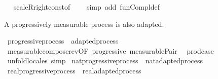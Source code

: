 \begin{isabellebody}
\isadelimproof
\ %
\endisadelimproof
%
\isatagproof
{}\isamarkupfalse%
\ scaleR{\isacharunderscore}{\kern0pt}right{\isacharunderscore}{\kern0pt}const{\isacharbrackleft}{\kern0pt}of\ {\isachardoublequoteopen}{\isasymlambda}{\isacharunderscore}{\kern0pt}{\isachardot}{\kern0pt}\ {\isacharminus}{\kern0pt}{}{\isachardoublequoteclose}{\isacharbrackright}{\kern0pt}\ \isamarkupfalse%
\ {\isacharparenleft}{\kern0pt}simp\ add{\isacharcolon}{\kern0pt}\ fun{\isacharunderscore}{\kern0pt}Compl{\isacharunderscore}{\kern0pt}def{\isacharparenright}{\kern0pt}%
\endisatagproof
{\isafoldproof}%
%
\isadelimproof
%
\endisadelimproof
\isanewline
\isanewline
{}\isamarkupfalse%
%
\begin{isamarkuptext}%
A progressively measurable process is also adapted.%
\end{isamarkuptext}\isamarkuptrue%
\isamarkupfalse%
\ progressive{\isacharunderscore}{\kern0pt}process\ {\isasymsubseteq}\ adapted{\isacharunderscore}{\kern0pt}process%
\isadelimproof
\ %
\endisadelimproof
%
\isatagproof
{}\isamarkupfalse%
\ measurable{\isacharunderscore}{\kern0pt}compose{\isacharunderscore}{\kern0pt}rev{\isacharbrackleft}{\kern0pt}OF\ progressive\ measurable{\isacharunderscore}{\kern0pt}Pair{}{\isacharprime}{\kern0pt}{\isacharbrackright}{\kern0pt}\ \isamarkupfalse%
\ prod{\isachardot}{\kern0pt}case\ \isamarkupfalse%
\ {\isacharparenleft}{\kern0pt}unfold{\isacharunderscore}{\kern0pt}locales{\isacharparenright}{\kern0pt}\ simp%
\endisatagproof
{\isafoldproof}%
%
\isadelimproof
%
\endisadelimproof
\isanewline
\isanewline
{}\isamarkupfalse%
\ nat{\isacharunderscore}{\kern0pt}progressive{\isacharunderscore}{\kern0pt}process\ {\isasymsubseteq}\ nat{\isacharunderscore}{\kern0pt}adapted{\isacharunderscore}{\kern0pt}process%
\isadelimproof
\ %
\endisadelimproof
%
\isatagproof
\isacommand{{\isachardot}{\kern0pt}{\isachardot}{\kern0pt}}\isamarkupfalse%
%
\endisatagproof
{\isafoldproof}%
%
\isadelimproof
%
\endisadelimproof
\isanewline
{}\isamarkupfalse%
\ real{\isacharunderscore}{\kern0pt}progressive{\isacharunderscore}{\kern0pt}process\ {\isasymsubseteq}\ real{\isacharunderscore}{\kern0pt}adapted{\isacharunderscore}{\kern0pt}process%
\isadelimproof
\ %
\endisadelimproof
%
\isatagproof
\isacommand{{\isachardot}{\kern0pt}{\isachardot}{\kern0pt}}\isamarkupfalse%
%
\endisatagproof
{\isafoldproof}%
%
\isadelimproof
%
\endisadelimproof
%
\begin{isamarkuptext}%

\end{isamarkuptext}
\end{isabellebody}
